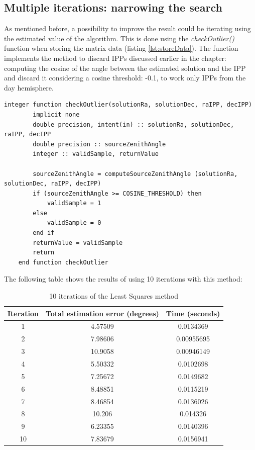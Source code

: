\subsection{Multiple iterations: narrowing the search} \label{sssec:covariance}

As mentioned before, a possibility to improve the result could be iterating using the estimated value of the algorithm. This is done using the \textit{checkOutlier()} function when storing the matrix data (listing \ref{lst:storeData}). The function implements the method to discard IPPs discussed earlier in the chapter:  computing the cosine of the angle between the estimated solution and the IPP and discard it considering a cosine threshold: -0.1, to work only IPPs from the day hemisphere.

\begin{minipage}{\linewidth}
	\label{lst:checkOutlier}
	\begin{lstlisting}[style=myFortranStyle, caption=Function checkOutlier to discard outliers]
	integer function checkOutlier(solutionRa, solutionDec, raIPP, decIPP)
		implicit none
		double precision, intent(in) :: solutionRa, solutionDec, raIPP, decIPP
		double precision :: sourceZenithAngle
		integer :: validSample, returnValue

		sourceZenithAngle = computeSourceZenithAngle (solutionRa, solutionDec, raIPP, decIPP)
		if (sourceZenithAngle >= COSINE_THRESHOLD) then
			validSample = 1
		else
			validSample = 0
		end if
		returnValue = validSample
		return
	end function checkOutlier\end{lstlisting}
\end{minipage}

The following table shows the results of using 10 iterations with this method:

\begin{table}[h!]
	\centering
	\def\arraystretch{1.2}
	\begin{tabular}{|c c c|} 
		\hline
		Iteration & Total estimation error (degrees) & Time (seconds) \\ [0.5ex] 
		\hline\hline
		1  & 4.57509 & 0.0134369 \\
		\hline
		2  & 7.98606 & 0.00955695 \\
		\hline
		3  & 10.9058 & 0.00946149 \\
		\hline
		4  & 5.50332 & 0.0102698 \\
		\hline
		5  & 7.25672 & 0.0149682 \\
		\hline
		6  & 8.48851 & 0.0115219 \\
		\hline
		7  & 8.46854 & 0.0136026 \\
		\hline
		8  & 10.206 & 0.014326 \\
		\hline
		9  & 6.23355 & 0.0140396 \\
		\hline
		10  & 7.83679 & 0.0156941 \\
		\hline
	\end{tabular}
	\caption{10 iterations of the Least Squares method}
\end{table}

